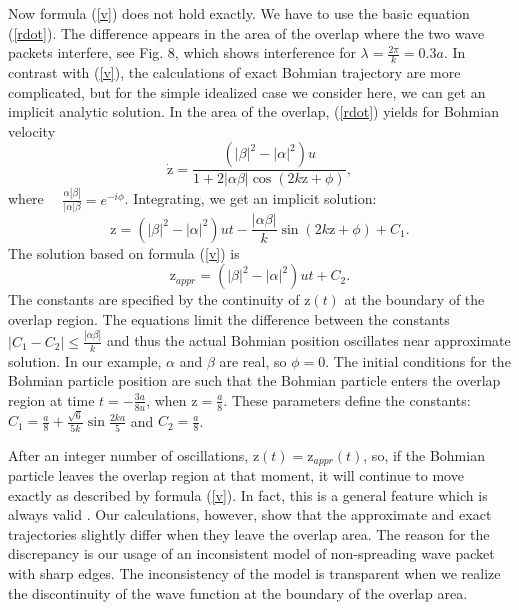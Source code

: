 \documentclass[preprint,tightenlines]{elsarticle}
\begin{document}
 Now formula (\ref{v})  does not hold exactly. We have to use the
basic equation (\ref{rdot}). The difference appears in the area of
the overlap where the two wave packets interfere, see Fig. 8, which shows interference for $\lambda=\frac{2\pi}{k}=0.3a$. In contrast with
(\ref{v}), the calculations of exact Bohmian trajectory are more
complicated, but for the simple idealized case we consider here, we
can get an implicit analytic solution. In the area of the overlap,
(\ref{rdot}) yields for Bohmian velocity
\begin{equation}
\dot{\mathrm{z}}=\frac{(|\beta|^{2}-|\alpha|^{2})u}{1+2|\alpha\beta|\cos(2k\mathrm{z}+\phi)},\label{zdotns}
\end{equation}
 where $\quad\frac{\alpha|\beta|}{|\alpha|\beta}=e^{-i\phi}$. Integrating,
we get an implicit solution:
\begin{equation}
\mathrm{z}=(|\beta|^{2}-|\alpha|^{2})ut-\frac{|\alpha\beta|}{k}\sin(2k\mathrm{z}+\phi)+C_{1}.\label{zns}
\end{equation}
 The solution based on formula (\ref{v}) is
  \begin{equation}
\mathrm{z}_{appr}=(|\beta|^{2}-|\alpha|^{2})ut+C_{2}.\label{zns1}
\end{equation}
 The constants are specified by the continuity of $\mathrm{z}(t)$
at the boundary of the overlap region. The equations limit the difference
between the constants $|C_{1}-C_{2}|\leq\frac{|\alpha\beta|}{k}$
and thus the actual Bohmian position oscillates near approximate solution.
In our example, $\alpha$ and $\beta$ are real, so $\phi=0$. The
initial conditions for the Bohmian particle position are such that
the Bohmian particle enters the overlap region at time $t=-\frac{3a}{8u}$,
when $\mathrm{z}=\frac{a}{8}$. These parameters define the constants:
$C_{1}=\frac{a}{8} +\frac{\sqrt 6}{5k}\sin\frac{2ka}{5}$ and $C_{2}=\frac{a}{8}$.


After an integer number of oscillations, $\mathrm{z}(t)=\mathrm{z}_{appr}(t)$, so, if the Bohmian particle leaves the overlap
region at that moment,  it will continue
to move exactly as described by formula (\ref{v}).  In fact, this is a general feature which is
always valid \cite{Gold}. Our calculations, however, show that the approximate and exact trajectories  slightly differ when they leave the overlap area.
 The reason for the discrepancy is our usage of   an inconsistent model of non-spreading wave packet with sharp edges.
The  inconsistency of the model   is transparent when we
realize  the discontinuity of the wave function  at the boundary of the overlap area.
\end{document}
